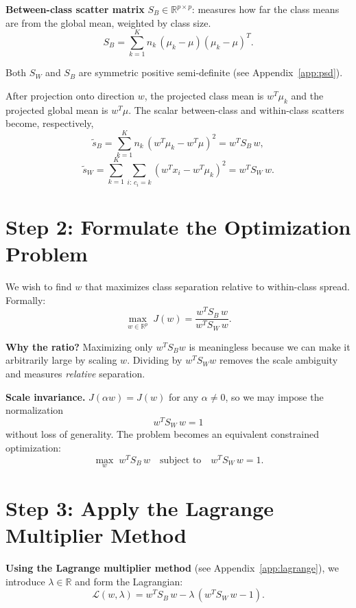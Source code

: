 \documentclass[11pt]{article}
\begin{document}
\textbf{Between-class scatter matrix} $S_B \in \mathbb{R}^{p\times p}$: measures how far the class means are from the global mean, weighted by class size.
\[
  S_B = \sum_{k=1}^{K} n_k\,(\mu_k - \mu)(\mu_k - \mu)^T.
\]

Both $S_W$ and $S_B$ are symmetric positive semi-definite (see Appendix~\ref{app:psd}).

After projection onto direction $w$, the projected class mean is $w^T\mu_k$ and the projected global mean is $w^T\mu$.
The scalar between-class and within-class scatters become, respectively,
\[
  \widetilde{s}_B = \sum_{k=1}^K n_k\,(w^T\mu_k - w^T\mu)^2 = w^T S_B\, w,
\]
\[
  \widetilde{s}_W = \sum_{k=1}^K\sum_{i:\,c_i=k}(w^T x_i - w^T\mu_k)^2 = w^T S_W\, w.
\]

\section*{Step 2: Formulate the Optimization Problem}

We wish to find $w$ that maximizes class separation relative to within-class spread.
Formally:
\[
  \max_{w \in \mathbb{R}^p} \; J(w) = \frac{w^T S_B\, w}{w^T S_W\, w}.
\]

\textbf{Why the ratio?}
Maximizing only $w^T S_B w$ is meaningless because we can make it arbitrarily large by scaling $w$.
Dividing by $w^T S_W w$ removes the scale ambiguity and measures \emph{relative} separation.

\textbf{Scale invariance.}
$J(\alpha w) = J(w)$ for any $\alpha \neq 0$, so we may impose the normalization
\[
  w^T S_W\, w = 1
\]
without loss of generality.
The problem becomes an equivalent constrained optimization:
\[
  \max_{w}\; w^T S_B\, w \quad \text{subject to} \quad w^T S_W\, w = 1.
\]

\section*{Step 3: Apply the Lagrange Multiplier Method}

\textbf{Using the Lagrange multiplier method} (see Appendix~\ref{app:lagrange}), we introduce $\lambda \in \mathbb{R}$ and form the Lagrangian:
\[
  \mathcal{L}(w, \lambda) = w^T S_B\, w - \lambda\,(w^T S_W\, w - 1).
\]
\end{document}
